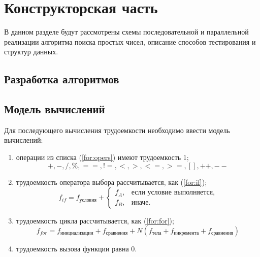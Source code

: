 \chapter{Конструкторская часть}
В данном разделе будут рассмотрены схемы последовательной и параллельной реализации алгоритма поиска простых чисел, описание способов тестирования и структур данных. 
\section{Разработка алгоритмов}

{}


\clearpage
{}

\section{Модель вычислений}

Для последующего вычисления трудоемкости необходимо ввести модель вычислений:
\begin{enumerate}
    \item операции из списка (\ref{for:opers}) имеют трудоемкость 1;
        \begin{equation}
            \label{for:opers}
            +, -, /, \%, ==, !=, <, >, <=, >=, [], ++, {-}-
        \end{equation}
    \item трудоемкость оператора выбора  рассчитывается, как (\ref{for:if});
	\begin{equation}
        \label{for:if}
        f_{if} = f_{\text{условия}} +
        \begin{cases}
        f_A, & \text{если условие выполняется,}\\
        f_B, & \text{иначе.}
        \end{cases}
	\end{equation}
\item трудоемкость цикла рассчитывается, как (\ref{for:for});
    \begin{equation}
        \label{for:for}
        f_{for} = f_{\text{инициализации}} + f_{\text{сравнения}} + N(f_{\text{тела}} + f_{\text{инкремента}} + f_{\text{сравнения}})
    \end{equation}
	\item трудоемкость вызова функции равна 0.
\end{enumerate}



